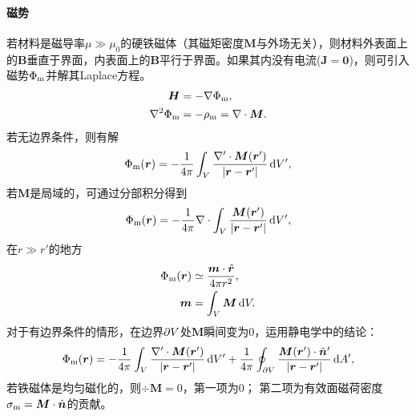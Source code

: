 \paragraph{磁势}
若材料是磁导率$\mu \gg \mu_0$的硬铁磁体（其磁矩密度$\bm M$与外场无关），则材料外表面上的$\bm B$垂直于界面，内表面上的$\bm B$平行于界面。如果其内没有电流($\bm J = \bm0$)，则可引入磁势$\Phi_\mathrm m$并解其Laplace方程。
\begin{subequations}
    \begin{align}
        \bm H &= -\nabla\Phi_\mathrm m,\\
        \nabla^2\Phi_\mathrm m &= -\rho_\mathrm m = \nabla\cdot\bm M.
    \end{align}
\end{subequations}
若无边界条件，则有解
\begin{equation}
    \Phi_\mathrm m(\bm r) = -\frac1{4\pi}\int_V\frac{\nabla' \cdot \bm M(\bm r')}{\lvert\bm r - \bm r'\rvert}\mathop{}\!\mathrm{d} V',
\end{equation}
若$\bm M$是局域的，可通过分部积分得到
\begin{equation}
    \Phi_\mathrm m(\bm r) = -\frac1{4\pi}\nabla\cdot\int_V\frac{\bm M(\bm r')}{\lvert\bm r - \bm r'\rvert}\mathop{}\!\mathrm{d} V',
\end{equation}
在$r \gg r'$的地方
\begin{subequations}
    \label{eq:ed-magnetic-dipole-scalar-potential}
    \begin{align}
        \Phi_\mathrm m(\bm r) &\simeq \frac{\bm m \cdot \mathop{}\!\hat{\bm{r}}}{4\pi r^2},\\
        \bm m &= \int_V\bm M\mathop{}\!\mathrm{d} V.
    \end{align}
\end{subequations}
对于有边界条件的情形，在边界$\partial V$处$\bm M$瞬间变为0，运用静电学中的结论：
\begin{equation}
    \label{eqn:PhiM with boundary}
    \Phi_\mathrm m(\bm r) = -\frac1{4\pi}\int_V\frac{\nabla' \cdot \bm M(\bm r')}{\lvert\bm r - \bm r'\rvert}\mathop{}\!\mathrm{d} V' + \frac1{4\pi}\oint_{\partial V}\frac{\bm M(\bm r') \cdot \mathop{}\!\hat{\bm{n}}'}{\lvert\bm r - \bm r'\rvert}\mathop{}\!\mathrm{d} A',
\end{equation}
若铁磁体是均匀磁化的，则$\div\bm M = 0$，第一项为0；
第二项为有效面磁荷密度$\sigma_\mathrm m = \bm M \cdot \mathop{}\!\hat{\bm{n}}$的贡献。

